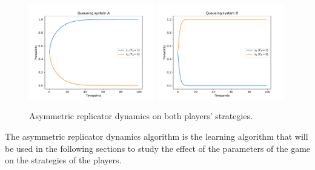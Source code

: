 \begin{figure}[H]
    \centering
    \includegraphics[width=0.49\textwidth]{chapters/04_game_theoretic_model/img/numeric_results/asymmetric_replicator_dynamics_A.pdf}
    \includegraphics[width=0.49\textwidth]{chapters/04_game_theoretic_model/img/numeric_results/asymmetric_replicator_dynamics_B.pdf}
    \caption{Asymmetric replicator dynamics on both players' strategies.}
    \label{fig:solving_game_asymmetric_replicator_example}
\end{figure}

The asymmetric replicator dynamics algorithm is the learning algorithm that
will be used in the following sections to study the effect of the parameters
of the game on the strategies of the players.
